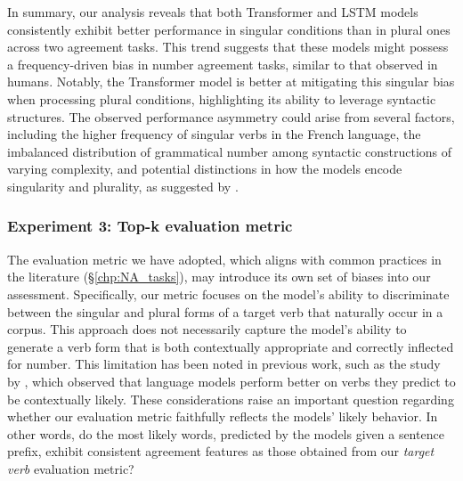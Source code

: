 In summary, our analysis reveals that both Transformer and LSTM models consistently exhibit better performance in singular conditions than in plural ones across two agreement tasks. This trend suggests that these models might possess a frequency-driven bias in number agreement tasks, similar to that observed in humans. Notably, the Transformer model is better at mitigating this singular bias when processing plural conditions, highlighting its ability to leverage syntactic structures. The observed performance asymmetry could arise from several factors, including the higher frequency of singular verbs in the French language, the imbalanced distribution of grammatical number among syntactic constructions of varying complexity, and potential distinctions in how the models encode singularity and plurality, as suggested by \cite{jumelet-etal-2019-analysing}. 

\subsubsection{Experiment 3: Top-k evaluation metric} \label{sec:topK_metric}
The evaluation metric we have adopted, which aligns with common practices in the literature  (\S\ref{chp:NA_tasks}), may introduce its own set of biases into our assessment. Specifically, our metric focuses on the model's ability to discriminate between the singular and plural forms of a target verb that naturally occur in a corpus. This approach does not necessarily capture the model's ability to generate a verb form that is both contextually appropriate and correctly inflected for number. This limitation has been noted in previous work, such as the study by \cite{newman-etal-2021-refining}, which observed that language models perform better on verbs they predict to be contextually likely. These considerations raise an important question regarding whether our evaluation metric faithfully reflects the models' likely behavior. In other words, do the most likely words, predicted by the models given a sentence prefix, exhibit consistent agreement features as those obtained from our \textit{target verb} evaluation metric?



